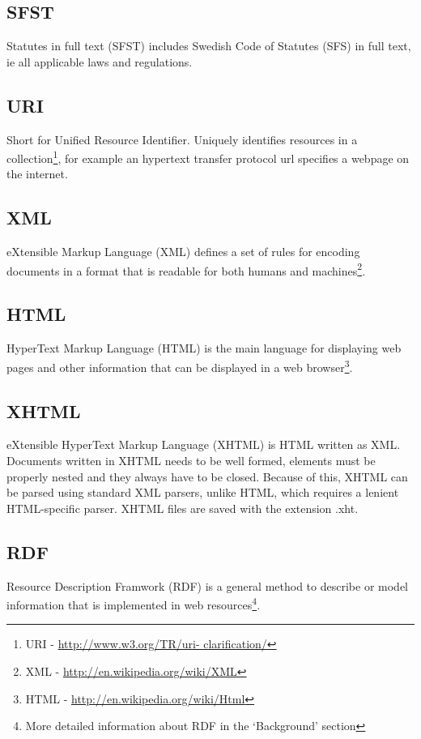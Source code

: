 \subsection*{SFST}
Statutes in full text (SFST) includes Swedish Code of Statutes (SFS) in
full text, ie all applicable laws and regulations.

\subsection*{URI} Short for Unified Resource Identifier. Uniquely identifies
resources in a collection\footnote{URI - \url{http://www.w3.org/TR/uri-
clarification/}}, for example an hypertext transfer protocol url specifies a
webpage on the internet.

\subsection*{XML} eXtensible Markup Language (XML) defines a set of rules for
encoding documents in a format that is readable for both humans and
machines\footnote{XML - \url{http://en.wikipedia.org/wiki/XML}}.

\subsection*{HTML} HyperText Markup Language (HTML) is the main language for
displaying web pages and other information that can be displayed in a web
browser\footnote{HTML - \url{http://en.wikipedia.org/wiki/Html}}.

\subsection*{XHTML}
eXtensible HyperText Markup Language (XHTML) is HTML written as XML. Documents written in XHTML needs to be well formed, elements must be properly nested and they always have to be closed. Because of this, XHTML can be parsed using standard XML parsers, unlike HTML, which requires a lenient HTML-specific parser. XHTML files are saved with the extension .xht.

\subsection*{RDF} Resource Description Framwork (RDF) is a general method to
describe or model information that is implemented in web
resources\footnote{More detailed information about RDF in the ‘Background’
section}.

